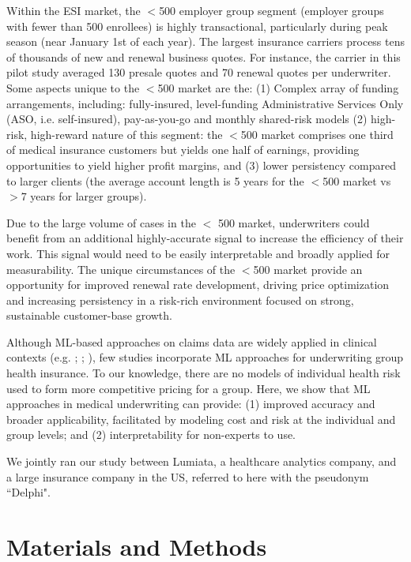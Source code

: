 \documentclass[letterpaper]{article}
\begin{document}
Within the ESI market, the $<$500 employer group segment (employer groups with fewer than 500 enrollees) is highly transactional, particularly during peak season (near January 1st of each year). The largest insurance carriers process tens of thousands of new  and renewal business quotes.  For instance, the carrier in this pilot study averaged 130 presale quotes and 70 renewal quotes per underwriter.  Some aspects unique to the $<$500 market are the:
(1) Complex array of funding arrangements, including: fully-insured, level-funding Administrative Services Only (ASO, i.e. self-insured), pay-as-you-go and monthly shared-risk models \cite{GrowEmpInt}
(2) high-risk, high-reward nature of this segment:  the $<$500 market comprises one third of medical insurance customers but yields one half of earnings, providing opportunities to yield higher profit margins, and
(3) lower persistency compared to larger clients (the average account length is 5 years for the $<$500 market vs $>$7 years for larger groups).


Due to the large volume of cases in the $<$ 500 market, underwriters could benefit from an additional highly-accurate signal to increase the efficiency of their work.  This signal would need to be easily interpretable and broadly applied for measurability. The unique circumstances of the $<$500 market provide an opportunity for improved renewal rate development, driving price optimization and increasing persistency in a risk-rich environment focused on strong, sustainable customer-base growth.

Although ML-based approaches on claims data are widely applied in clinical contexts (e.g. \citeauthor{DM2} \citeyear{DM2}; \citeauthor{CostBloom} \citeyear{CostBloom}; \citeauthor{scalable} \citeyear{scalable}), few studies incorporate ML approaches for underwriting group health insurance.  To our knowledge, there are no models of individual health risk used to form more competitive pricing for a group. Here, we show that ML approaches in medical underwriting can provide: (1)  improved accuracy and broader applicability, facilitated by modeling cost and risk at the individual and group levels; and (2) interpretability for non-experts to use.


We jointly ran our study between Lumiata, a healthcare analytics company, and a large insurance company in the US, referred to here with the pseudonym ``Delphi".

\section*{Materials and Methods}
\end{document}
